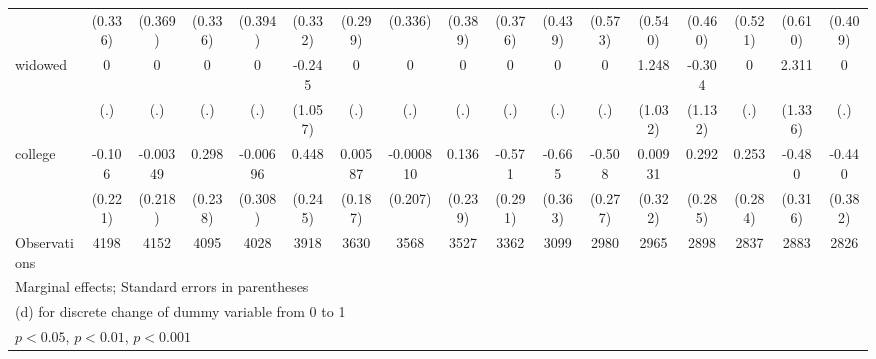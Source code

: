 {\begin{tabular}{l*{16}{c}}
                    &     (0.336)         &     (0.369)         &     (0.336)         &     (0.394)         &     (0.332)         &     (0.299)         &     (0.336)         &     (0.389)         &     (0.376)         &     (0.439)         &     (0.573)         &     (0.540)         &     (0.460)         &     (0.521)         &     (0.610)         &     (0.409)         \\
[1em]
widowed             &           0         &           0         &           0         &           0         &      -0.245         &           0         &           0         &           0         &           0         &           0         &           0         &       1.248         &      -0.304         &           0         &       2.311         &           0         \\
                    &         (.)         &         (.)         &         (.)         &         (.)         &     (1.057)         &         (.)         &         (.)         &         (.)         &         (.)         &         (.)         &         (.)         &     (1.032)         &     (1.132)         &         (.)         &     (1.336)         &         (.)         \\
[1em]
college             &      -0.106         &    -0.00349         &       0.298         &    -0.00696         &       0.448         &     0.00587         &   -0.000810         &       0.136         &      -0.571\sym{*}  &      -0.665         &      -0.508         &     0.00931         &       0.292         &       0.253         &      -0.480         &      -0.440         \\
                    &     (0.221)         &     (0.218)         &     (0.238)         &     (0.308)         &     (0.245)         &     (0.187)         &     (0.207)         &     (0.239)         &     (0.291)         &     (0.363)         &     (0.277)         &     (0.322)         &     (0.285)         &     (0.284)         &     (0.316)         &     (0.382)         \\
\hline
Observations        &        4198         &        4152         &        4095         &        4028         &        3918         &        3630         &        3568         &        3527         &        3362         &        3099         &        2980         &        2965         &        2898         &        2837         &        2883         &        2826         \\
\hline\hline
\multicolumn{17}{l}{\footnotesize Marginal effects; Standard errors in parentheses}\\
\multicolumn{17}{l}{\footnotesize  (d) for discrete change of dummy variable from 0 to 1}\\
\multicolumn{17}{l}{\footnotesize \sym{*} \(p<0.05\), \sym{**} \(p<0.01\), \sym{***} \(p<0.001\)}\\
\end{tabular}
}
